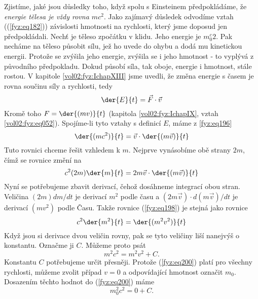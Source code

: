     Zjistíme, jaké jsou důsledky toho, když spolu s Einsteinem předpokládáme, že \emph{energie
    tělesa je vždy rovna \(mc^2\)}. Jako zajímavý důsledek odvodíme vztah ((\ref{fyz:eq182}))
    závislosti hmotnosti na rychlosti, který jsme doposud jen předpokládali. Nechť je těleso
    zpočátku v klidu. Jeho energie je \(m_0^c2\). Pak necháme na těleso působit sílu, jež ho uvede
    do ohybu a dodá mu kinetickou energii. Protože se zvýšila jeho energie, zvýšila se i jeho
    hmotnost - to vyplývá z původního předpokladu. Dokud působí síla, tak oboje, energie i hmotnost,
    stále rostou. V kapitole \ref{vol02:fyz:IchapXIII} jsme uvedli, že změna energie s časem je
    rovna součinu síly a rychlosti, tedy
    \begin{equation}\label{fyz:eq196}
      \der{E}{t} = \vec{F}\cdot\vec{v}
    \end{equation}
    Kromě toho \(F=\der{(mv)}{t}\) (kapitola \ref{vol02:fyz:IchapIX}, vztah \ref{vol02:fyz:eq052}).
    Spojíme-li tyto vztahy s definicí \(E\), máme z \ref{fyz:eq196}
    \begin{equation}\label{fyz:eq197}
      \der{(mc^2)}{t} = \vec{v}\cdot\der{(m\vec{v})}{t}
    \end{equation}
    Tuto rovnici chceme řešit vzhledem k \(m\). Nejprve vynásobíme obě strany \(2m\), čímž se 
    rovnice změní na
    \begin{equation}\label{fyz:eq198}
      c^2(2m)\der{m}{t} = 2m\vec{v}\cdot\der{(m\vec{v})}{t}
    \end{equation}
    Nyní se potřebujeme zbavit derivací, čehož dosáhneme integrací obou stran. Veličina \((2m) 
    dm/dt\) je derivací \(m^2\) podle času a \((2m\vec{v})\cdot d(m\vec{v})/dt\) je derivací 
    \((mv^2)\) podle Času. Takže rovnice (\ref{fyz:eq198}) je stejná jako rovnice 
    \begin{equation}\label{fyz:eq199}
      c^2\der{m^2}{t} = \der{(m^2v^2)}{t}
    \end{equation}
    Když jsou si derivace dvou veličin rovny, pak se tyto veličiny liší nanejvýš o konstantu. 
    Označme ji \(C\). Můžeme proto psát
    \begin{equation}\label{fyz:eq200}
      m^2c^2 = m^2v^2 + C.
    \end{equation}
    Konstantu \(C\) potřebujeme určit přesněji. Protože (\ref{fyz:eq200}) platí pro všechny 
    rychlosti, můžeme zvolit případ \(v = 0\) a odpovídající hmotnost označit \(m_0\). Dosazením 
    těchto hodnot do (\ref{fyz:eq200}) máme
    \begin{equation}\label{fyz:eq201}
      m_0^2c^2 = 0 + C.
    \end{equation}
